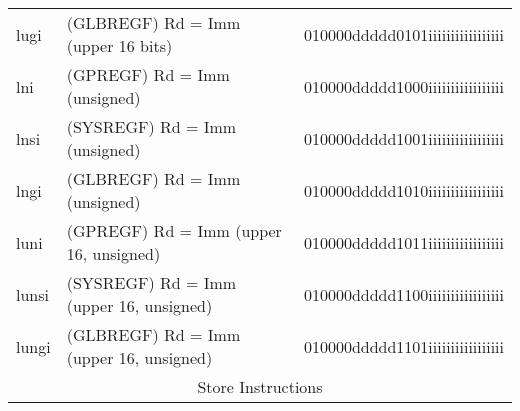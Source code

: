 \documentclass[letterpaper, 11pt]{article}
\begin{document}
\begin{center}
\begin{longtable}{|l|l|c|}
			lugi		& (GLBREGF) Rd = Imm	 (upper 16 bits)		& 010000ddddd0101iiiiiiiiiiiiiiiii \\
			lni			& (GPREGF) Rd = Imm	(unsigned)					& 010000ddddd1000iiiiiiiiiiiiiiiii \\
			lnsi		& (SYSREGF) Rd = Imm (unsigned)					& 010000ddddd1001iiiiiiiiiiiiiiiii \\
			lngi		& (GLBREGF) Rd = Imm (unsigned)					& 010000ddddd1010iiiiiiiiiiiiiiiii \\
			luni		& (GPREGF) Rd = Imm	 (upper 16, unsigned)		& 010000ddddd1011iiiiiiiiiiiiiiiii \\
			lunsi		& (SYSREGF) Rd = Imm (upper 16, unsigned)		& 010000ddddd1100iiiiiiiiiiiiiiiii \\
			lungi		& (GLBREGF) Rd = Imm	(upper 16, unsigned)	& 010000ddddd1101iiiiiiiiiiiiiiiii \\
			\hline
			\multicolumn{3}{|c|}{Store Instructions} \\ \hline


\end{longtable}
\end{center}
\end{document}
